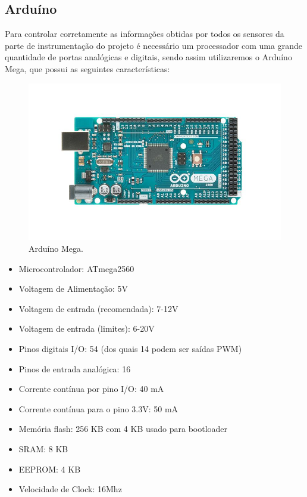     \subsection{Arduíno}
    Para controlar corretamente as informações obtidas por todos os sensores da parte de instrumentação do projeto é necessário um processador com uma grande quantidade de portas analógicas e digitais, sendo assim utilizaremos o Arduíno Mega, que possui as seguintes características:

    \begin{figure}[H]                                                  
      \centering                                                       
      \includegraphics[scale=0.4]{figuras/arduino_mega.png} 
      \caption{Arduíno Mega.}                  
      \label{img:arduino_mega}                                             
    \end{figure}                                                       

    \begin{itemize}
      \item Microcontrolador: ATmega2560
      \item Voltagem de Alimentação: 5V
      \item Voltagem de entrada (recomendada): 7-12V
      \item Voltagem de entrada (limites): 6-20V
      \item Pinos digitais I/O: 54 (dos quais 14 podem ser saídas PWM)
      \item Pinos de entrada analógica: 16
      \item Corrente contínua por pino I/O: 40 mA
      \item Corrente contínua para o pino 3.3V: 50 mA
      \item Memória flash: 256 KB com 4 KB usado para bootloader
      \item SRAM: 8 KB
      \item EEPROM: 4 KB
      \item Velocidade de Clock: 16Mhz
    \end{itemize}
  

